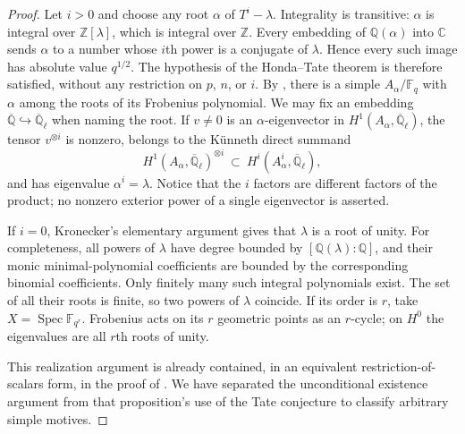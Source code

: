 \begin{proof}
Let $i>0$ and choose any root $\alpha$ of $T^i-\lambda$. Integrality is
transitive: $\alpha$ is integral over $\mathbb Z[\lambda]$, which is
integral over $\mathbb Z$. Every embedding of $\mathbb Q(\alpha)$ into
$\mathbb C$ sends $\alpha$ to a number whose $i$th power is a conjugate
of $\lambda$. Hence every such image has absolute value $q^{1/2}$.
The hypothesis of the Honda--Tate theorem is therefore satisfied,
without any restriction on $p$, $n$, or $i$.
By \citet[Th\'eor\`eme~1(i), p.~96]{Tate1971}, there is a simple
$A_\alpha/\mathbb F_q$ with $\alpha$ among the roots of its Frobenius
polynomial. We may fix an embedding $\overline{\mathbb Q}\hookrightarrow
\overline{\mathbb Q}_\ell$ when naming the root. If $v\ne0$ is an
$\alpha$-eigenvector in $H^1(A_\alpha,\overline{\mathbb Q}_\ell)$,
the tensor $v^{\otimes i}$ is nonzero, belongs to the K\"unneth direct
summand
\[
 H^1(A_\alpha,\overline{\mathbb Q}_\ell)^{\otimes i}
 \ \subset\ H^i(A_\alpha^i,\overline{\mathbb Q}_\ell),
\]
and has eigenvalue $\alpha^i=\lambda$. Notice that the $i$ factors are
different factors of the product; no nonzero exterior power of a single
eigenvector is asserted.

If $i=0$, Kronecker's elementary argument gives that $\lambda$ is a root
of unity. For completeness, all powers of $\lambda$ have degree bounded
by $[\mathbb Q(\lambda):\mathbb Q]$, and their monic minimal-polynomial
coefficients are bounded by the corresponding binomial coefficients.
Only finitely many such integral polynomials exist. The set of all their
roots is finite, so two powers of $\lambda$ coincide. If its order is
$r$, take $X=\operatorname{Spec}\mathbb F_{q^r}$. Frobenius acts on its
$r$ geometric points as an $r$-cycle; on $H^0$ the eigenvalues are all
$r$th roots of unity.

This realization argument is already contained, in an equivalent
restriction-of-scalars form, in the proof of
\citet[Proposition~2.6]{Milne1994}. We have separated the unconditional
existence argument from that proposition's use of the Tate conjecture
to classify arbitrary simple motives.
\end{proof}

